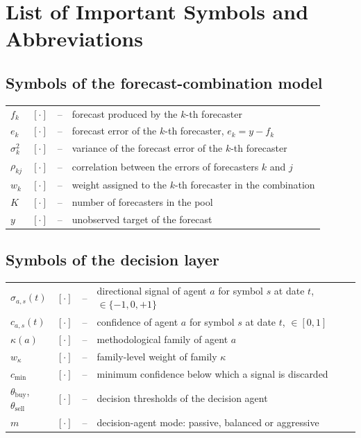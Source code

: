 \chapter*{List of Important Symbols and Abbreviations}

\section*{Symbols of the forecast-combination model}
\noindent
\begin{tabular}{l r c l}
    $f_k$        & $[\cdot]$ &--& forecast produced by the $k$-th forecaster \\
    $e_k$        & $[\cdot]$ &--& forecast error of the $k$-th forecaster, $e_k = y - f_k$ \\
    $\sigma_k^2$ & $[\cdot]$ &--& variance of the forecast error of the $k$-th forecaster \\
    $\rho_{kj}$  & $[\cdot]$ &--& correlation between the errors of forecasters $k$ and $j$ \\
    $w_k$        & $[\cdot]$ &--& weight assigned to the $k$-th forecaster in the combination \\
    $K$          & $[\cdot]$ &--& number of forecasters in the pool \\
    $y$          & $[\cdot]$ &--& unobserved target of the forecast \\
\end{tabular}

\section*{Symbols of the decision layer}
\noindent
\begin{tabular}{l r c l}
    $\sigma_{a,s}(t)$ & $[\cdot]$ &--& directional signal of agent $a$ for symbol $s$ at date $t$, $\in \{-1,0,+1\}$ \\
    $c_{a,s}(t)$      & $[\cdot]$ &--& confidence of agent $a$ for symbol $s$ at date $t$, $\in [0,1]$ \\
    $\kappa(a)$       & $[\cdot]$ &--& methodological family of agent $a$ \\
    $w_\kappa$        & $[\cdot]$ &--& family-level weight of family $\kappa$ \\
    $c_{\min}$        & $[\cdot]$ &--& minimum confidence below which a signal is discarded \\
    $\theta_\text{buy}$, $\theta_\text{sell}$ & $[\cdot]$ &--& decision thresholds of the decision agent \\
    $m$               & $[\cdot]$ &--& decision-agent mode: passive, balanced or aggressive \\
\end{tabular}

